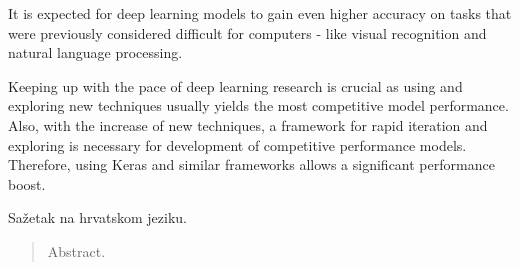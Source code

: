 \documentclass[times, utf8, diplomski]{fer}
\begin{document}
It is expected for deep learning models to gain even higher accuracy on tasks that were previously considered difficult for computers - like visual recognition and natural language processing.  

Keeping up with the pace of deep learning research is crucial as using and exploring new techniques usually yields the most competitive model performance. Also, with the increase of new techniques, a framework for rapid iteration and exploring is necessary for development of competitive performance models. Therefore, using Keras and similar frameworks allows a significant performance boost.






\begin{sazetak}
Sažetak na hrvatskom jeziku.

\end{sazetak}

\begin{abstract}
Abstract.

\end{abstract}
\end{document}
